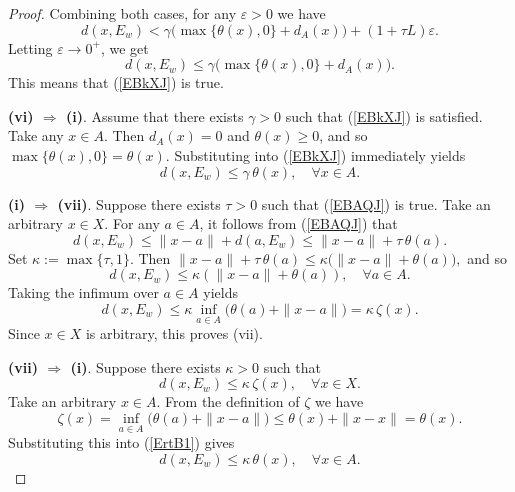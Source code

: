 \documentclass[10pt,a4paper]{amsart}
\begin{document}
\begin{proof}
Combining both cases, for any $\varepsilon>0$ we have
\[
d(x,E_w) < \gamma\bigl(\max\{\theta(x),0\}+d_A(x)\bigr) + (1+\tau L)\varepsilon.
\]
Letting $\varepsilon\to0^+$, we get
\[
d(x,E_w) \le \gamma\bigl(\max\{\theta(x),0\}+d_A(x)\bigr).
\]
 This means that (\ref{EBkXJ}) is true.

  
 
 	\noindent\textbf{(vi) $\Rightarrow$ (i)}.
 Assume that  there exists $\gamma>0$ such that (\ref{EBkXJ}) is satisfied.
  Take any $x\in A$. Then $d_A(x)=0$  and   $\theta(x)\ge0$, and so $\max\{\theta(x),0\}=\theta(x)$. Substituting into (\ref{EBkXJ}) immediately yields
 \[
 d(x,E_w)\le \gamma\,\theta(x),\quad \forall x\in A.
 \]
  
 
 
  	\noindent\textbf{(i) $\Rightarrow$ (vii)}.
  Suppose there exists \(\tau > 0\) such that   (\ref{EBAQJ}) is true.
 Take an arbitrary \(x \in X\). For any \(a \in A\),   it follows from  (\ref{EBAQJ})  that
 \[
 d(x, E_w) \le \|x - a\| + d(a, E_w) \le \|x - a\| + \tau \, \theta(a).
 \]
 Set \(\kappa := \max\{\tau, 1\}\). Then  
$  \|x - a\| + \tau \, \theta(a) \le \kappa \bigl( \|x - a\| + \theta(a) \bigr),$  and so
   $$d(x, E_w) \le \kappa (\|x - a\| + \theta(a)),  \quad  \forall a \in A.  $$
 Taking the infimum over \(a \in A\) yields  
 \[
 d(x, E_w) \le \kappa \inf_{a \in A} \bigl( \theta(a) + \|x - a\| \bigr) = \kappa \, \zeta(x).
 \]
 Since \(x \in X\) is arbitrary, this proves (vii).
 
 
  	\noindent\textbf{(vii) $\Rightarrow$ (i)}.
 Suppose there exists \(\kappa > 0\) such that 
 \begin{equation}\label{ErtB1}
 	d(x, E_w) \le \kappa \, \zeta(x), \quad  \forall x \in X.
 \end{equation}
 Take an arbitrary \(x \in A\). From the definition of \(\zeta\) we have  
 \[
\zeta(x) = \inf_{a \in A} \bigl( \theta(a) + \|x - a\| \bigr) \le \theta(x) + \|x - x\| = \theta(x).
 \]
 Substituting this into    (\ref{ErtB1})   gives  
 \[
 d(x, E_w) \le \kappa \, \theta(x), \quad \forall x \in A.
 \]
  
	

	 	
	  

\end{proof}
\end{document}
